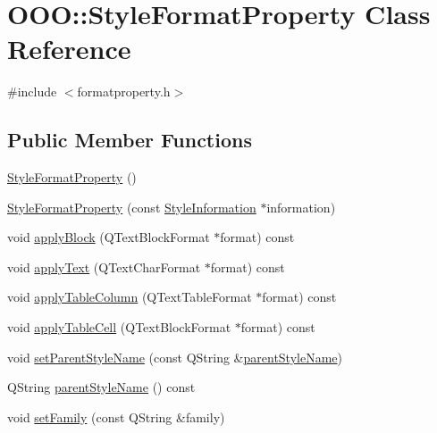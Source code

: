 \hypertarget{classOOO_1_1StyleFormatProperty}{\section{O\+O\+O\+:\+:Style\+Format\+Property Class Reference}
\label{classOOO_1_1StyleFormatProperty}
}


{\ttfamily \#include $<$formatproperty.\+h$>$}

\subsection*{Public Member Functions}
\begin{DoxyCompactItemize}
\item 
\hyperlink{classOOO_1_1StyleFormatProperty_a55923635b5a4697ba1b4e3366b68edec}{Style\+Format\+Property} ()
\item 
\hyperlink{classOOO_1_1StyleFormatProperty_a58fcc91919a3a06cf8037325c03ffcfa}{Style\+Format\+Property} (const \hyperlink{classOOO_1_1StyleInformation}{Style\+Information} $\ast$information)
\item 
void \hyperlink{classOOO_1_1StyleFormatProperty_adb08bff832497841617d6bf6c97561fe}{apply\+Block} (Q\+Text\+Block\+Format $\ast$format) const 
\item 
void \hyperlink{classOOO_1_1StyleFormatProperty_ae9c09024e05a8150bd3947ba63f97ee2}{apply\+Text} (Q\+Text\+Char\+Format $\ast$format) const 
\item 
void \hyperlink{classOOO_1_1StyleFormatProperty_a2d0585ea9cab33696e8cd5699168635e}{apply\+Table\+Column} (Q\+Text\+Table\+Format $\ast$format) const 
\item 
void \hyperlink{classOOO_1_1StyleFormatProperty_ac88cdb833ae35a05a08a1809afa0d5ad}{apply\+Table\+Cell} (Q\+Text\+Block\+Format $\ast$format) const 
\item 
void \hyperlink{classOOO_1_1StyleFormatProperty_ab6dc7a5a0e81347f1dc1428ab77cb29c}{set\+Parent\+Style\+Name} (const Q\+String \&\hyperlink{classOOO_1_1StyleFormatProperty_a80fc7b56cacf26449765b89caeeae7d0}{parent\+Style\+Name})
\item 
Q\+String \hyperlink{classOOO_1_1StyleFormatProperty_a80fc7b56cacf26449765b89caeeae7d0}{parent\+Style\+Name} () const 
\item 
void \hyperlink{classOOO_1_1StyleFormatProperty_a3f53384eec7b44a07e2c8e06bbf097bf}{set\+Family} (const Q\+String \&family)
\item 

\end{DoxyCompactItemize}
